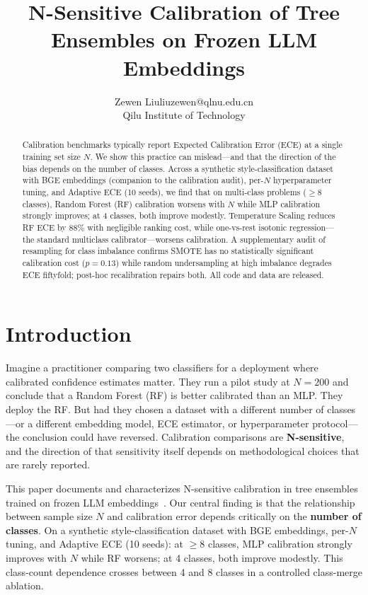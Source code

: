 \documentclass[11pt]{article}
\title{N-Sensitive Calibration of Tree Ensembles on Frozen LLM Embeddings}
\author{\name Zewen Liu\email liuzewen@qlnu.edu.cn\\\addr Qilu Institute of Technology}  %
\date{}
\begin{document}
\maketitle

\begin{abstract}
Calibration benchmarks typically report Expected Calibration Error (ECE) at a single training set size $N$. We show this practice can mislead---and that the direction of the bias depends on the number of classes. Across a synthetic style-classification dataset with BGE embeddings (companion to the calibration audit), per-$N$ hyperparameter tuning, and Adaptive ECE (10 seeds), we find that on multi-class problems (${\geq}8$ classes), Random Forest (RF) calibration worsens with $N$ while MLP calibration strongly improves; at 4 classes, both improve modestly. Temperature Scaling reduces RF ECE by $88\%$ with negligible ranking cost, while one-vs-rest isotonic regression---the standard multiclass calibrator---worsens calibration. A supplementary audit of resampling for class imbalance confirms SMOTE has no statistically significant calibration cost ($p{=}0.13$) while random undersampling at high imbalance degrades ECE fiftyfold; post-hoc recalibration repairs both. All code and data are released.
\end{abstract}

\newpage

\section{Introduction}

Imagine a practitioner comparing two classifiers for a deployment where calibrated confidence estimates matter. They run a pilot study at $N=200$ and conclude that a Random Forest (RF) is better calibrated than an MLP. They deploy the RF. But had they chosen a dataset with a different number of classes---or a different embedding model, ECE estimator, or hyperparameter protocol---the conclusion could have reversed. Calibration comparisons are \textbf{N-sensitive}, and the direction of that sensitivity itself depends on methodological choices that are rarely reported.

This paper documents and characterizes N-sensitive calibration in tree ensembles trained on frozen LLM embeddings~\cite{reimers2019sentence,grinsztajn2022tree}. Our central finding is that the relationship between sample size $N$ and calibration error depends critically on the \textbf{number of classes}. On a synthetic style-classification dataset with BGE embeddings, per-$N$ tuning, and Adaptive ECE (10 seeds): at $\geq 8$ classes, MLP calibration strongly improves with $N$ while RF worsens; at 4 classes, both improve modestly. This class-count dependence crosses between 4 and 8 classes in a controlled class-merge ablation.
\end{document}

